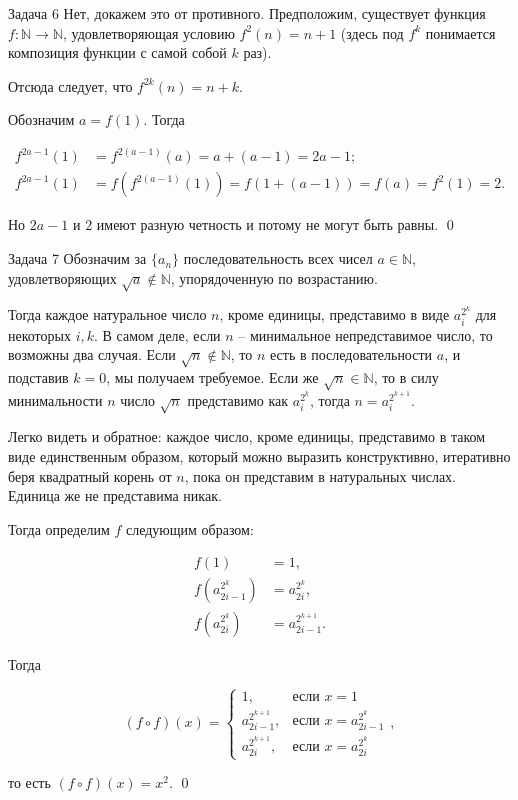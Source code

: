 \documentclass{article}
\newcommand{\N}{\mathbb{N}}
\begin{document}
	\begin{section}{Задача 6}
		Нет, докажем это от противного. Предположим, существует функция $f: \N \to \N$, удовлетворяющая условию $f^2(n) = n + 1$ (здесь под $f^k$ понимается композиция функции с самой собой $k$ раз).

		Отсюда следует, что $f^{2k}(n) = n + k$.

		Обозначим $a = f(1)$. Тогда

		\begin{align*}
			f^{2a-1}(1) &= f^{2(a-1)}(a) = a + (a - 1) = 2a - 1; \\
			f^{2a-1}(1) &= f(f^{2(a-1)}(1)) = f(1 + (a - 1)) = f(a) = f^2(1) = 2.
		\end{align*}

		Но $2a - 1$ и $2$ имеют разную четность и потому не могут быть равны. \qed
	\end{section}

	\begin{section}{Задача 7}
		Обозначим за $\{a_n\}$ последовательность всех чисел $a \in \N$, удовлетворяющих $\sqrt{a} \not\in \N$, упорядоченную по возрастанию.

		Тогда каждое натуральное число $n$, кроме единицы, представимо в виде $a_i^{2^k}$ для некоторых $i, k$. В самом деле, если $n$ -- минимальное непредставимое число, то возможны два случая. Если $\sqrt{n} \not\in \N$, то $n$ есть в последовательности $a$, и подставив $k = 0$, мы получаем требуемое. Если же $\sqrt{n} \in \N$, то в силу минимальности $n$ число $\sqrt{n}$ представимо как $a_i^{2^k}$, тогда $n = a_i^{2^{k+1}}$.

		Легко видеть и обратное: каждое число, кроме единицы, представимо в таком виде единственным образом, который можно выразить конструктивно, итеративно беря квадратный корень от $n$, пока он представим в натуральных числах. Единица же не представима никак.

		Тогда определим $f$ следующим образом:

		\begin{align*}
			f(1) &= 1, \\
			f \left( a_{2i-1}^{2^k} \right) &= a_{2i}^{2^k}, \\
			f \left( a_{2i}^{2^k} \right) &= a_{2i-1}^{2^{k+1}}.
		\end{align*}

		Тогда

		\begin{equation*}
			(f \circ f)(x) = \begin{cases}
				1, & \text{если } x = 1 \\
				a_{2i-1}^{2^{k+1}}, & \text{если } x = a_{2i-1}^{2^k} \\
				a_{2i}^{2^{k+1}}, & \text{если } x = a_{2i}^{2^k}
			\end{cases},
		\end{equation*}

		то есть $(f \circ f)(x) = x^2$. \qed
	\end{section}
\end{document}
